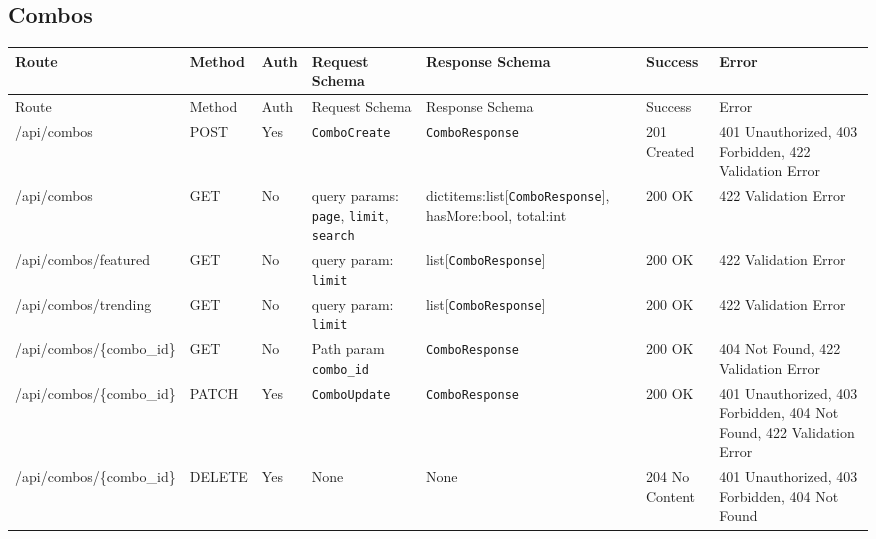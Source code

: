 \subsection{Combos}
\begin{longtable}{p{3.2cm} p{1.7cm} p{2.2cm} p{3.6cm} p{3.6cm} p{1.8cm} p{1.8cm}}
\toprule
Route & Method & Auth & Request Schema & Response Schema & Success & Error \\
\midrule
\endfirsthead
\toprule
Route & Method & Auth & Request Schema & Response Schema & Success & Error \\
\midrule
\endhead
\bottomrule
\endfoot

/api/combos & POST & Yes & \texttt{ComboCreate} & \texttt{ComboResponse} & 201 Created & 401 Unauthorized, 403 Forbidden, 422 Validation Error \\

/api/combos & GET & No & query params: \texttt{page}, \texttt{limit}, \texttt{search} & dict{items:list[\texttt{ComboResponse}], hasMore:bool, total:int} & 200 OK & 422 Validation Error \\

/api/combos/featured & GET & No & query param: \texttt{limit} & list[\texttt{ComboResponse}] & 200 OK & 422 Validation Error \\

/api/combos/trending & GET & No & query param: \texttt{limit} & list[\texttt{ComboResponse}] & 200 OK & 422 Validation Error \\

/api/combos/\{combo\_id\} & GET & No & Path param \texttt{combo\_id} & \texttt{ComboResponse} & 200 OK & 404 Not Found, 422 Validation Error \\

/api/combos/\{combo\_id\} & PATCH & Yes & \texttt{ComboUpdate} & \texttt{ComboResponse} & 200 OK & 401 Unauthorized, 403 Forbidden, 404 Not Found, 422 Validation Error \\

/api/combos/\{combo\_id\} & DELETE & Yes & None & None & 204 No Content & 401 Unauthorized, 403 Forbidden, 404 Not Found \\
\end{longtable}

